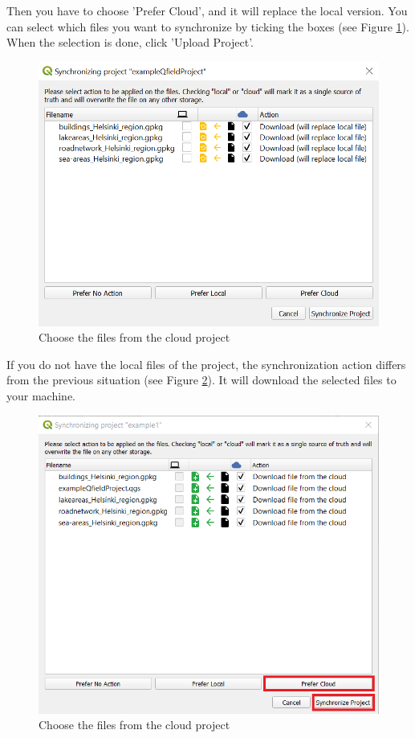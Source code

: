 \documentclass{article}
\begin{document}
Then you have to choose 'Prefer Cloud', and it will replace the local version. You can select which files you want to synchronize by ticking the boxes (see Figure \ref{fig:download-1}). When the selection is done, click 'Upload Project'.

\begin{figure}[H]
    \centering
    \includegraphics[width=1\textwidth]{qfieldcloud_download.PNG}
    \caption{Choose the files from the cloud project}
    \label{fig:download-1}
\end{figure}

If you do not have the local files of the project, the synchronization action differs from the previous situation (see Figure \ref{fig:download-2}). It will download the selected files to your machine.

\begin{figure}[H]
    \centering
    \includegraphics[width=1\textwidth]{dl-project-2.png}
    \caption{Choose the files from the cloud project}
    \label{fig:download-2}
\end{figure}
\end{document}
